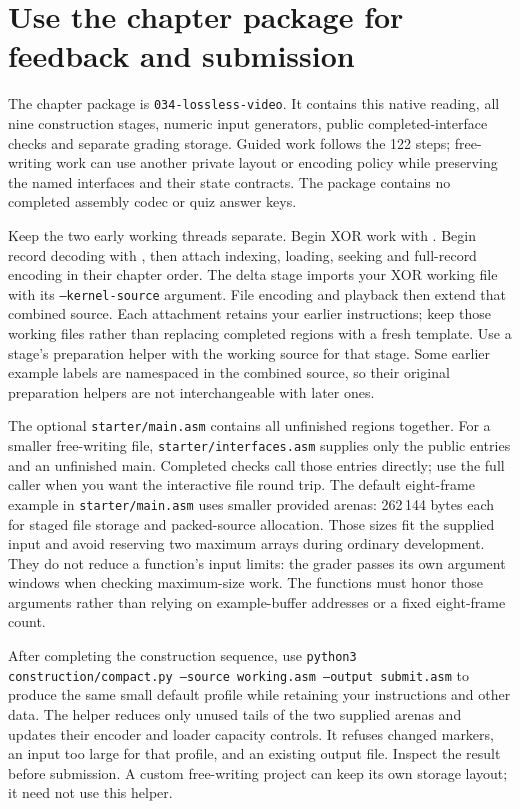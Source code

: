\section{Use the chapter package for feedback and submission}
The chapter package is \texttt{034-lossless-video}. It contains this native reading,
all nine construction stages, numeric input generators, public completed-interface
checks and separate grading storage. Guided work follows the 122 steps; free-writing
work can use another private layout or encoding policy while preserving the named
interfaces and their state contracts. The package contains no completed assembly
codec or quiz answer keys.

Keep the two early working threads separate. Begin XOR work with
. Begin record decoding with
, then attach indexing,
loading, seeking and full-record encoding in their chapter order. The delta stage
imports your XOR working file with its \texttt{--kernel-source} argument. File
encoding and playback then extend that combined source. Each attachment retains
your earlier instructions; keep those working files rather than replacing completed
regions with a fresh template. Use a stage's preparation helper with the working
source for that stage. Some earlier example labels are namespaced in the combined
source, so their original preparation helpers are not interchangeable with later
ones.

The optional \texttt{starter/main.asm} contains all unfinished regions together.
For a smaller free-writing file, \texttt{starter/interfaces.asm} supplies only the
public entries and an unfinished main. Completed checks call those entries directly;
use the full caller when you want the interactive file round trip.
The default eight-frame example in \texttt{starter/main.asm} uses smaller provided arenas: 262\,144 bytes each
for staged file storage and packed-source allocation. Those sizes fit the supplied
input and avoid reserving two maximum arrays during ordinary development. They do
not reduce a function's input limits: the grader passes its own argument windows
when checking maximum-size work. The functions must honor those arguments rather
than relying on example-buffer addresses or a fixed eight-frame count.

After completing the construction sequence, use
\texttt{python3 construction/compact.py --source working.asm --output submit.asm}
to produce the same small default profile while retaining your instructions and
other data. The helper reduces only unused tails of the two supplied arenas and
updates their encoder and loader capacity controls. It refuses changed markers,
an input too large for that profile, and an existing output file. Inspect the result
before submission. A custom free-writing project can keep its own storage layout;
it need not use this helper.

